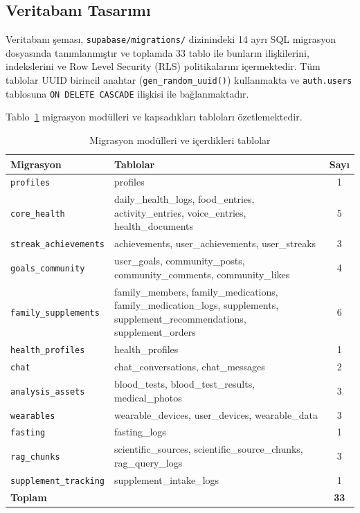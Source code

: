 \subsection{Veritabanı Tasarımı}

Veritabanı şeması, \texttt{supabase/migrations/} dizinindeki 14 ayrı SQL migrasyon dosyasında tanımlanmıştır ve toplamda 33 tablo ile bunların ilişkilerini, indekslerini ve Row Level Security (RLS) politikalarını içermektedir. Tüm tablolar UUID birincil anahtar (\texttt{gen\_random\_uuid()}) kullanmakta ve \texttt{auth.users} tablosuna \texttt{ON DELETE CASCADE} ilişkisi ile bağlanmaktadır.

Tablo~\ref{tab:db_modules} migrasyon modülleri ve kapsadıkları tabloları özetlemektedir.

\begin{table}[H]
\centering
\caption{Migrasyon modülleri ve içerdikleri tablolar}
\label{tab:db_modules}
\small
\begin{tabular}{|l|p{}|c|}
\hline
\textbf{Migrasyon} & \textbf{Tablolar} & \textbf{Sayı} \\
\hline
\texttt{profiles}              & profiles                                                           & 1 \\
\texttt{core\_health}          & daily\_health\_logs, food\_entries, activity\_entries, voice\_entries, health\_documents & 5 \\
\texttt{streak\_achievements}  & achievements, user\_achievements, user\_streaks                    & 3 \\
\texttt{goals\_community}      & user\_goals, community\_posts, community\_comments, community\_likes & 4 \\
\texttt{family\_supplements}   & family\_members, family\_medications, family\_medication\_logs, supplements, supplement\_recommendations, supplement\_orders & 6 \\
\texttt{health\_profiles}      & health\_profiles                                                   & 1 \\
\texttt{chat}                  & chat\_conversations, chat\_messages                                & 2 \\
\texttt{analysis\_assets}      & blood\_tests, blood\_test\_results, medical\_photos                & 3 \\
\texttt{wearables}             & wearable\_devices, user\_devices, wearable\_data                   & 3 \\
\texttt{fasting}               & fasting\_logs                                                      & 1 \\
\texttt{rag\_chunks}           & scientific\_sources, scientific\_source\_chunks, rag\_query\_logs  & 3 \\
\texttt{supplement\_tracking}  & supplement\_intake\_logs                                           & 1 \\
\hline
\textbf{Toplam}                &                                                                    & \textbf{33} \\
\hline
\end{tabular}
\end{table}


